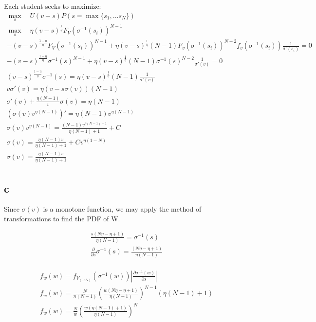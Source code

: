 \documentclass[10pt]{paper}
\begin{document}
Each student seeks to maximize:
\begin{align*}
  \max_s\quad U( v - s ) P( s = \max\{ s_1, ... s_N \} )\\
  \max_s \quad \eta (v - s )^{\frac{1}{\eta}} F_V( \sigma^{-1}(s_i))^{N-1}\\
  - ( v - s)^{ \frac{1-\eta}{\eta}} F_V(\sigma^{-1}(s_i))^{N-1} + \eta(v-s)^{\frac{1}{\eta}}(N-1)F_v( \sigma^{-1}(s_i))^{N-2}f_v(\sigma^{-1}(s_i))\frac{1}{\sigma'(s_i)} = 0\\
  -(v-s)^{\frac{1-\eta}{\eta}}\sigma^{-1}(s)^{N-1} + \eta (v-s)^{\frac{1}{\eta}}(N-1)\sigma^{-1}(s)^{N-2} \frac{1}{\sigma'(v)} = 0\\
  (v-s)^{\frac{1-\eta}{\eta}} \sigma^{-1}(s) = \eta (v-s)^{\frac{1}{\eta}}(N-1)\frac{1}{\sigma'(v)}\\
  v\sigma'(v) = \eta(v-s\sigma(v))(N-1)\\
  \sigma'(v) + \frac{\eta(N-1)}{v}\sigma(v) = \eta (N-1)\\
  (\sigma(v) v^{\eta(N-1)})' = \eta (N-1) v^{\eta(N-1)}\\
  \sigma(v) v^{\eta(N-1)} = \frac{(N-1)v^{\eta (N-1) + 1}}{\eta(N-1) + 1} + C\\
  \sigma(v) = \frac{\eta (N-1)v}{\eta(N-1)+1} + Cv^{\eta (1-N) }\\
  \sigma(v) = \frac{\eta (N-1)v}{\eta(N-1)+1}\\
\end{align*}

\subsection*{c}



Since $\sigma(v)$ is a monotone function, we may apply the method of
transformations to find the PDF of W.


\begin{align*}
  \frac{s \left(N \eta - \eta + 1\right)}{\eta \left(N - 1\right)} = \sigma^{-1}(s)\\
  \frac{\partial}{\partial s} \sigma^{-1}(s) = \frac{ \left(N \eta - \eta + 1\right)}{\eta \left(N - 1\right)}\\
\end{align*}

\begin{align*}
  f_w(w) = f_{V_{(1:N)}}( \sigma^{-1}(w)) \left | \frac{\partial \sigma^{-1}(w)}{\partial s} \right |\\
  f_w(w) = \frac{N}{n \left(N - 1\right)} \left(\frac{w \left(N \eta - \eta + 1\right)}{\eta \left(N - 1\right)}\right)^{N - 1} \left(\eta(N-1) + 1\right)\\
  f_w(w) = \frac{N}{w} \left(\frac{w \left(\eta(N-1) + 1\right)}{\eta \left(N - 1\right)}\right)^{N}\\
\end{align*}
\end{document}
